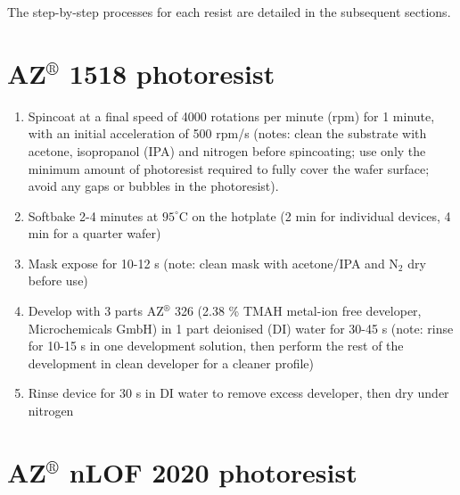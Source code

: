 \documentclass[
  a4paper,
]{scrbook}
\begin{document}
The step-by-step processes for each resist are detailed in the
subsequent sections.

\hypertarget{azcircledr-1518-photoresist}{%
\section{\texorpdfstring{AZ\(^\circledR\) 1518
photoresist}{AZ\^{}\textbackslash circledR 1518 photoresist}}\label{azcircledr-1518-photoresist}}

\begin{enumerate}
\def\labelenumi{\arabic{enumi}.}
\item
  Spincoat at a final speed of 4000 rotations per minute (rpm) for 1
  minute, with an initial acceleration of 500 rpm/s (notes: clean the
  substrate with acetone, isopropanol (IPA) and nitrogen before
  spincoating; use only the minimum amount of photoresist required to
  fully cover the wafer surface; avoid any gaps or bubbles in the
  photoresist).
\item
  Softbake 2-4 minutes at \(95^\circ\)C on the hotplate (2 min for
  individual devices, 4 min for a quarter wafer)
\item
  Mask expose for 10-12 s (note: clean mask with acetone/IPA and N\(_2\)
  dry before use)
\item
  Develop with 3 parts AZ\(^\circledR\) 326 (2.38 \% TMAH metal-ion free
  developer, Microchemicals GmbH) in 1 part deionised (DI) water for
  30-45 s (note: rinse for 10-15 s in one development solution, then
  perform the rest of the development in clean developer for a cleaner
  profile)
\item
  Rinse device for 30 s in DI water to remove excess developer, then dry
  under nitrogen
\end{enumerate}

\hypertarget{azcircledr-nlof-2020-photoresist}{%
\section{\texorpdfstring{AZ\(^\circledR\) nLOF 2020
photoresist}{AZ\^{}\textbackslash circledR nLOF 2020 photoresist}}\label{azcircledr-nlof-2020-photoresist}}
\end{document}
